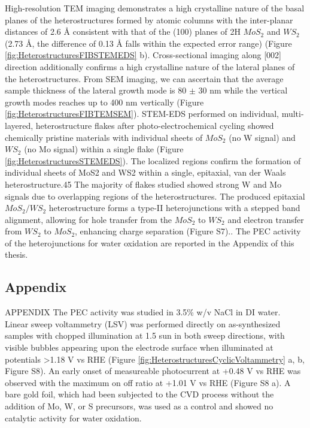High-resolution TEM imaging demonstrates a high crystalline nature of the basal planes of the heterostructures formed by atomic columns with the inter-planar distances of 2.6 \r{A} consistent with that of the (100) planes of 2H $MoS_2$ and $WS_2$ (2.73 \r{A}, the difference of 0.13 \r{A} falls within the expected error range) (Figure \ref{fig:HeterostructuresFIBSTEMEDS} b). Cross-sectional imaging along [002] direction additionally confirms a high crystalline nature of the lateral planes of the heterostructures. From SEM imaging, we can ascertain that the average sample thickness of the lateral growth mode is 80 $\pm$ 30 nm while the vertical growth modes reaches up to 400 nm vertically (Figure \ref{fig:HeterostructuresFIBTEMSEM}). STEM-EDS performed on individual, multi-layered, heterostructure flakes after photo-electrochemical cycling showed chemically pristine materials with individual sheets of $MoS_2$ (no W signal) and $WS_2$ (no Mo signal) within a single flake (Figure \ref{fig:HeterostructuresSTEMEDS}). The localized regions confirm the formation of individual sheets of MoS2 and WS2 within a single, epitaxial, van der Waals heterostructure.45 The majority of flakes studied showed strong W and Mo signals due to overlapping regions of the heterostructures. The produced epitaxial $MoS_2/WS_2$ heterostructure forms a type-II heterojunctions with a stepped band alignment, allowing for hole transfer from the $MoS_2$ to $WS_2$ and electron transfer from $WS_2$ to $MoS_2$, enhancing charge separation (Figure S7).\cite{Zhuang2013}\cite{Hong2014}\cite{Ma2018}. 
The PEC activity of the heterojunctions for water oxidation are reported in the Appendix of this thesis. 

\newpage
\subsection{Appendix}

APPENDIX
The PEC activity was studied in 3.5\% w/v NaCl in DI water. Linear sweep voltammetry (LSV) was performed directly on as-synthesized samples with chopped illumination at 1.5 sun in both sweep directions, with visible bubbles appearing upon the electrode surface when illuminated at potentials >1.18 V vs RHE (Figure \ref{fig:HeterostructuresCyclicVoltammetry} a, b, Figure S8). An early onset of measureable photocurrent at +0.48 V vs RHE was observed with the maximum on off ratio at +1.01 V vs RHE (Figure S8 a). A bare gold foil, which had been subjected to the CVD process without the addition of Mo, W, or S precursors, was used as a control and showed no catalytic activity for water oxidation. 

